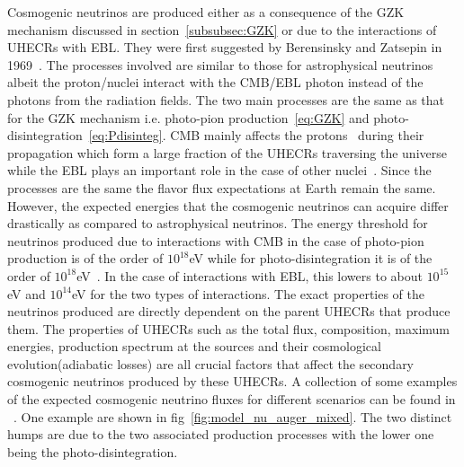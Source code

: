 Cosmogenic neutrinos are produced either as a consequence of the GZK mechanism discussed in section~\ref{subsubsec:GZK} or due to the interactions of UHECRs with EBL. They were first suggested by Berensinsky and Zatsepin in 1969~\cite{Berezinsky:1970xj}. The processes involved are similar to those for astrophysical neutrinos albeit the proton/nuclei interact with the CMB/EBL photon instead of the photons from the radiation fields. The two main processes are the same as that for the GZK mechanism i.e. photo-pion production~\ref{eq:GZK} and photo-disintegration~\ref{eq:Pdisinteg}. CMB mainly affects the protons~\cite{Ehlert_2024} during their propagation which form a large fraction of the UHECRs traversing the universe while the EBL plays an important role in the case of other nuclei~\cite{Aloisio_2015}. 
Since the processes are the same the flavor flux expectations at Earth remain the same. However, the expected energies that the cosmogenic neutrinos can acquire differ drastically as compared to astrophysical neutrinos. The energy threshold for neutrinos produced due to interactions with CMB in the case of photo-pion production is of the order of $10^{18}$eV while for photo-disintegration it is of the order of $10^{18}$eV~\cite{Aloisio_2015}. In the case of interactions with EBL, this lowers to about $10^{15}$eV and $10^{14}$eV for the two types of interactions. 
The exact properties of the neutrinos produced are directly dependent on the parent UHECRs that produce them. The properties of UHECRs such as the total flux, composition, maximum energies, production spectrum at the sources and their cosmological evolution(adiabatic losses) are all crucial factors that affect the  secondary cosmogenic neutrinos produced by these UHECRs. A collection of some examples of the expected cosmogenic neutrino fluxes for different scenarios can be found in ~\cite{KAMPERT2012660,AlvesBatista:2018zui,Heinze:2019jou}. One example are shown in fig~\ref{fig:model_nu_auger_mixed}. The two distinct humps are due to the two associated production processes with the lower one being the photo-disintegration. 

